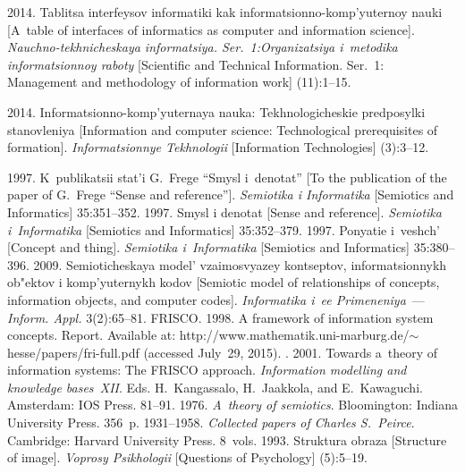 {\begin{multicols}{2}
{{\begin{thebibliography}{99}
 2014. Tablitsa interfeysov informatiki kak informatsionno-komp'yuternoy 
nauki [A~table of interfaces of informatics as computer and information science]. 
\textit{Nauchno-tekhnicheskaya informatsiya. Ser.~1:\linebreak Organizatsiya i~metodika 
informatsionnoy raboty} [Scientific and Technical Information. Ser.~1: Management and 
methodology of information work] (11):1--15.

 2014. Informatsionno-komp'yuternaya nauka: Tekhnologicheskie 
predposylki stanovleniya [Information and computer science: Technological prerequisites of 
formation]. \textit{Informatsionnye Tekhnologii} [Information Technologies] (3):3--12.

 1997. K~publikatsii stat'i G.~Frege ``Smysl i~denotat'' [To the 
publication of the paper of G.~Frege ``Sense and reference'']. \textit{Semiotika i Informatika} 
[Semiotics and Informatics] 35:351--352.
 1997. Smysl i denotat [Sense and reference]. \textit{Semiotika i~Informatika} 
[Semiotics and Informatics] 35:352--379.
 1997. Ponyatie i~veshch' [Concept and thing]. \textit{Semiotika 
i~Informatika} [Semiotics and Informatics] 35:380--396.
 2009. Semioticheskaya model' vzaimosvyazey kontseptov, 
informatsionnykh ob"ektov i komp'yuternykh kodov [Semiotic model of relationships of 
concepts, information objects, and computer codes]. \textit{Informatika i~ee Primeneniya}~--- 
\textit{Inform. Appl.} 3(2):65--81.
FRISCO.  1998. A framework of information system concepts. 
Report. Available at: {\sf 
http://www.mathematik.uni-marburg.de/$\sim$hesse/papers/fri-full.pdf} (accessed July~29, 
2015).
. 2001. {Towards a~theory of information 
systems: The FRISCO approach}. \textit{Information modelling and knowledge bases~XII}. 
Eds. H.~Kangassalo,  H.~Jaakkola, and E.~Kawaguchi.
Amsterdam: IOS Press. 81--91.
 1976. \textit{A~theory of semiotics}. Bloomington: Indiana University Press. 
356~p.
 1931--1958. \textit{Collected papers of Charles S.~Peirce}. 
Cambridge: Harvard University Press. 8~vols.
 1993. Struktura obraza [Structure of image]. \textit{Voprosy 
Psikhologii} [Questions of Psychology] (5):5--19.

\end{thebibliography}}}
\end{multicols}}
